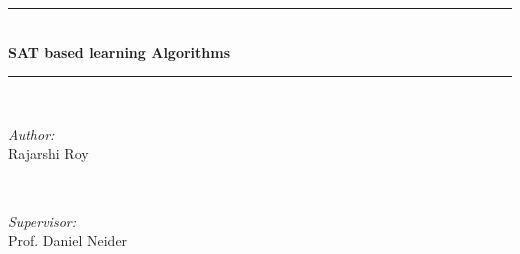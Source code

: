 \begin{titlepage}

\newcommand{\HRule}{\rule{\linewidth}{0.5mm}} %
\vspace{10cm}


\center %


\makeatletter
\HRule \\[0.4cm]
{ \huge \bfseries SAT based learning Algorithms}\\[0.4cm] %
\HRule \\[1.5cm]
 

\begin{minipage}{0.4\textwidth}
\begin{flushleft} \large
\emph{Author:}\\
Rajarshi Roy
\end{flushleft}
\end{minipage}
~
\begin{minipage}{0.4\textwidth}
\begin{flushright} \large
\emph{Supervisor:} \\
Prof. Daniel Neider
\end{flushright}
\end{minipage}\\[3cm]
\makeatother




\end{titlepage}
